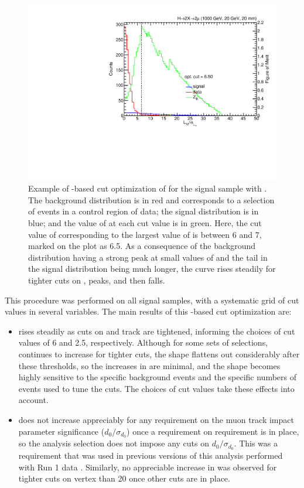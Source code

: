 \begin{figure}[htpb]
  \centering
  \includegraphics[width=\DFigWidth]{figures/displaced/OPT_LxySig_ZBi_HTo2XTo2Mu2J_1000_20_20.pdf}
  \caption[Example of \ZBi-based cut optimization of \LxySig.]{Example of \ZBi-based cut optimization of \LxySig for the \twoMu signal sample with . The background distribution is in red and corresponds to a selection of events in a control region of data; the signal distribution is in blue; and the value of \ZBi at each cut value is in green. Here, the cut value of \LxySig corresponding to the largest value of \ZBi is between 6 and 7, marked on the plot as 6.5. As a consequence of the background distribution having a strong peak at small values of \LxySig and the tail in the signal distribution being much longer, the \ZBi curve rises steadily for tighter cuts on \LxySig, peaks, and then falls.}
  \label{fig:dd:CutOptExample}
\end{figure}

This procedure was performed on all signal samples, with a systematic grid of cut values in several variables.
The main results of this \ZBi-based cut optimization are:
\begin{itemize}
  \item \ZBi rises steadily as cuts on \LxySig and track \normchisq are tightened, informing the choices of cut values of 6 and 2.5, respectively. Although for some sets of selections, \ZBi continues to increase for tighter cuts, the shape flattens out considerably after these thresholds, so the increases in \ZBi are minimal, and the shape becomes highly sensitive to the specific background events and the specific numbers of events used to tune the cuts. The choices of cut values take these effects into account.
  \item \ZBi does not increase appreciably for any requirement on the muon track impact parameter significance ($d_0/\sigma_{d_{0}}$) once a requirement on \LxySig requirement is in place, so the analysis selection does not impose any cuts on $d_0/\sigma_{d_{0}}$. This was a requirement that was used in previous versions of this analysis performed with Run 1 data \cite{EXO-12-037,CMS-PAS-EXO-14-012}. Similarly, no appreciable increase in \ZBi was observed for tighter cuts on vertex \chisq than 20 once other cuts are in place.
\end{itemize}

